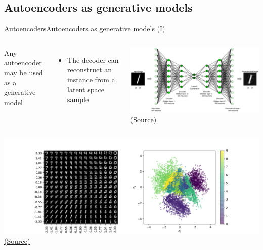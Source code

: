 \documentclass[10pt,compress]{beamer} %
\begin{document}
\subsection{Autoencoders as generative models}
\begin{frame}{Autoencoders}{Autoencoders as generative models (I)}
    \begin{columns}
     Any autoencoder may be used as a generative model
	\begin{itemize}
		\item The decoder can reconstruct an instance from a latent space sample
	\end{itemize}

	\includegraphics[width=\textwidth]{figs/autoencoder.png}\\
	\scriptsize\href{http://i-systems.github.io/HSE545/machine\%20learning\%20all/KIMM/06\_KIMM\_Autoencoder.html}{(Source)}
		
	\end{columns}

	\includegraphics[width=\textwidth]{figs/latent2.png}\\
	\scriptsize\href{https://towardsdatascience.com/intuitively-understanding-variational-autoencoders-1bfe67eb5daf}{(Source)}
\end{frame}
\end{document}
